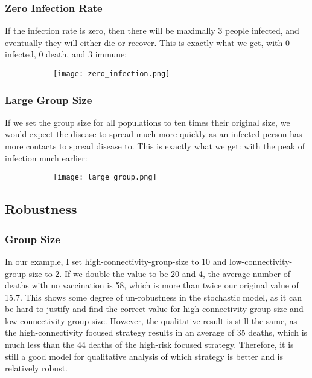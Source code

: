 \documentclass[titlepage]{article}
\begin{document}
\subsubsection{Zero Infection Rate}
If the infection rate is zero, then there will be maximally 3 people infected, and eventually they will either die or recover. This is exactly what we get, with 0 infected, 0 death, and 3 immune:
\begin{figure}[H]
       \centering
       \begin{subfigure}{0.48\textwidth}
       \centering
       \texttt{[image: zero\_infection.png]}
       \end{subfigure}\quad
\end{figure}
\subsubsection{Large Group Size}
If we set the group size for all populations to ten times their original size, we would expect the disease to spread much more quickly as an infected person has more contacts to spread disease to. This is exactly what we get: with the peak of infection much earlier:
\begin{figure}[H]
       \centering
       \begin{subfigure}{0.48\textwidth}
       \centering
       \texttt{[image: large\_group.png]}
       \end{subfigure}\quad
\end{figure}

\subsection{Robustness}
\subsubsection{Group Size}
In our example, I set high-connectivity-group-size to 10 and low-connectivity-group-size to 2. If we double the value to be 20 and 4, the average number of deaths with no vaccination is 58, which is more than twice our original value of 15.7. This shows some degree of un-robustness in the stochastic model, as it can be hard to justify and find the correct value for high-connectivity-group-size and low-connectivity-group-size. However, the qualitative result is still the same, as the high-connectivity focused strategy results in an average of 35 deaths, which is much less than the 44 deaths of the high-risk focused strategy. Therefore, it is still a good model for qualitative analysis of which strategy is better and is relatively robust.
\end{document}
